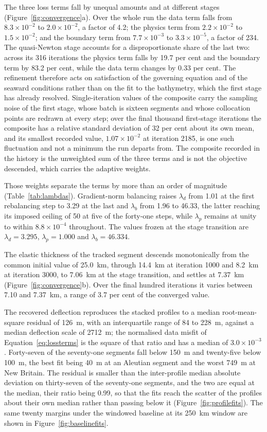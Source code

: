\documentclass[final]{agujournal2019}
\begin{document}
The three loss terms fall by unequal amounts and at different stages
(Figure~\ref{fig:convergence}a). Over the whole run the data term falls from
$8.3\times10^{-2}$ to $2.0\times10^{-2}$, a factor of 4.2; the physics term from
$2.2\times10^{-2}$ to $1.5\times10^{-2}$; and the boundary term from
$7.7\times10^{-3}$ to $3.3\times10^{-5}$, a factor of 234. The quasi-Newton stage
accounts for a disproportionate share of the last two: across its 316
iterations the physics term falls by 19.7 per cent and the boundary term by
83.2 per cent, while the data term changes by 0.33 per cent. The refinement
therefore acts on satisfaction of the governing equation and of the seaward
conditions rather than on the fit to the bathymetry, which the first stage has
already resolved. Single-iteration values of the composite carry the sampling
noise of the first stage, whose batch is sixteen segments and whose collocation
points are redrawn at every step; over the final thousand first-stage
iterations the composite has a relative standard deviation of 32 per cent about
its own mean, and its smallest recorded value, $1.07\times10^{-2}$ at iteration
2185, is one such fluctuation and not a minimum the run departs from. The
composite recorded in the history is the unweighted sum of the three terms and
is not the objective descended, which carries the adaptive weights.

Those weights separate the terms by more than an order of magnitude
(Table~\ref{tab:lambdas}). Gradient-norm balancing raises $\lambda_{d}$ from
1.01 at the first rebalancing step to 3.29 at the last and $\lambda_{b}$ from
1.96 to 46.33, the latter reaching its imposed ceiling of 50 at five of the
forty-one steps, while $\lambda_{p}$ remains at unity to within
$8.8\times10^{-4}$ throughout. The values frozen at the stage transition are
$\lambda_{d} = 3.295$, $\lambda_{p} = 1.000$ and $\lambda_{b} = 46.334$.

The elastic thickness of the tracked segment descends monotonically from the
common initial value of 25.0~km, through 14.4~km at iteration 1000 and 8.2~km
at iteration 3000, to 7.06~km at the stage transition, and settles at 7.37~km
(Figure~\ref{fig:convergence}b). Over the final hundred iterations it varies
between 7.10 and 7.37~km, a range of 3.7 per cent of the converged value.

The recovered deflection reproduces the stacked profiles to a median
root-mean-square residual of 126~m, with an interquartile range of 84 to 228~m,
against a median deflection scale of 2712~m; the normalised data misfit of
Equation~\eqref{eq:lossterms} is the square of that ratio and has a median of
$3.0\times10^{-3}$. Forty-seven of the seventy-one segments fall below 150~m and
twenty-five below 100~m, the best fit being 40~m at an Aleutian segment and the
worst 749~m at New Britain. The residual is smaller than the inter-profile
median absolute deviation on thirty-seven of the seventy-one segments, and the
two are equal at the median, their ratio being 0.99, so that the fits reach the
scatter of the profiles about their own median rather than passing below it
(Figure~\ref{fig:profilefits}). The same twenty margins under the windowed
baseline at its 250~km window are shown in Figure~\ref{fig:baselinefits}.
\end{document}
